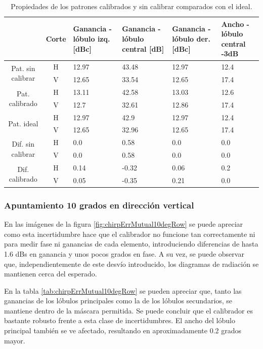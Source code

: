\begin{table}[H]
  \footnotesize
  \centering
  \begin{tabular}{|c|c|p{2cm}|p{2.5cm}|p{2.5cm}|p{2.5cm}|}
    \cline{2-6}
    \multicolumn{1}{c|}{} & Corte & Ganancia - lóbulo izq. [dBc] & Ganancia - lóbulo central [dB] &
    Ganancia - lóbulo der. [dBc] & Ancho - lóbulo central -3dB \tabularnewline\hline
    \multirow{2}{2cm}{Pat. sin calibrar} & H & 12.97 & 43.48 & 12.97 & 12.4 \tabularnewline\cline{2-6}
     & V & 12.65 & 33.54 & 12.65 & 17.4 \tabularnewline\hline
    \multirow{2}{2cm}{Pat. calibrado} & H & 13.11 & 42.58 & 13.03 & 12.6 \tabularnewline\cline{2-6}
     & V & 12.7 & 32.61 & 12.86 & 17.4 \tabularnewline\hline
    \multirow{2}{2cm}{Pat. ideal} & H & 12.97 & 42.9 & 12.97 & 12.4 \tabularnewline\cline{2-6}
     & V & 12.65 & 32.96 & 12.65 & 17.4 \tabularnewline\hline
    \multirow{2}{2cm}{Dif. sin calibrar} & H & 0.0 & 0.58 & 0.0 & 0.0\tabularnewline\cline{2-6}
     & V & 0.0 & 0.58 & 0.0 & 0.0 \tabularnewline\hline
    \multirow{2}{2cm}{Dif. calibrado} & H & 0.14 & -0.32 & 0.06 & 0.2 \tabularnewline\cline{2-6}
     & V & 0.05 & -0.35 & 0.21 & 0.0 \tabularnewline\hline
  \end{tabular}
  \caption{Propiedades de los patrones calibrados y sin calibrar comparados con el ideal.}
  \label{tab:chirpErrMutual10degCol}
\end{table}


\subsubsection{Apuntamiento 10 grados en dirección vertical}

En las imágenes de la figura \ref{fig:chirpErrMutual10degRow} se puede apreciar como esta incertidumbre hace que el calibrador 
no funcione tan correctamente ni para medir fase ni ganancias de cada elemento, introduciendo diferencias de hasta 1.6 dBs en 
ganancia y unos pocos grados en fase. A su vez, se puede observar que, independientemente de este desvío introducido, los diagramas de 
radiación se mantienen cerca del esperado.

En la tabla \ref{tab:chirpErrMutual10degRow} se pueden apreciar que, tanto las ganancias de los lóbulos principales como la de 
los lóbulos secundarios, se mantiene dentro de la máscara permitida. Se puede concluir que el calibrador es bastante robusto 
frente a esta clase de incertidumbres. El ancho del lóbulo principal también se ve afectado, resultando en aproximadamente 0.2
grados mayor.

